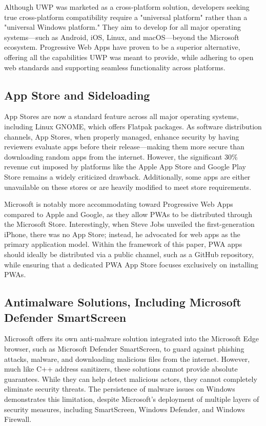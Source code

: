 Although UWP was marketed as a cross-platform solution, developers seeking true cross-platform compatibility require a "universal platform" rather than a "universal Windows platform." They aim to develop for all major operating systems—such as Android, iOS, Linux, and macOS—beyond the Microsoft ecosystem. Progressive Web Apps have proven to be a superior alternative, offering all the capabilities UWP was meant to provide, while adhering to open web standards and supporting seamless functionality across platforms.


\subsection{App Store and Sideloading}
App Stores are now a standard feature across all major operating systems, including Linux GNOME, which offers Flatpak packages. As software distribution channels, App Stores, when properly managed, enhance security by having reviewers evaluate apps before their release—making them more secure than downloading random apps from the internet. However, the significant 30\% revenue cut imposed by platforms like the Apple App Store and Google Play Store remains a widely criticized drawback. Additionally, some apps are either unavailable on these stores or are heavily modified to meet store requirements.

Microsoft is notably more accommodating toward Progressive Web Apps compared to Apple and Google, as they allow PWAs to be distributed through the Microsoft Store. Interestingly, when Steve Jobs unveiled the first-generation iPhone, there was no App Store; instead, he advocated for web apps as the primary application model. Within the framework of this paper, PWA apps should ideally be distributed via a public channel, such as a GitHub repository, while ensuring that a dedicated PWA App Store focuses exclusively on installing PWAs.

\subsection{Antimalware Solutions, Including Microsoft Defender SmartScreen}

Microsoft offers its own anti-malware solution integrated into the Microsoft Edge browser, such as Microsoft Defender SmartScreen, to guard against phishing attacks, malware, and downloading malicious files from the internet. However, much like C++ address sanitizers, these solutions cannot provide absolute guarantees. While they can help detect malicious actors, they cannot completely eliminate security threats. The persistence of malware issues on Windows demonstrates this limitation, despite Microsoft's deployment of multiple layers of security measures, including SmartScreen, Windows Defender, and Windows Firewall.

